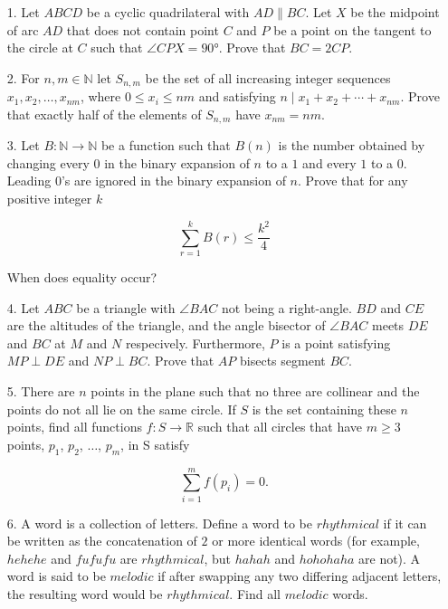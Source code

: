 \documentclass{article}
\begin{document}
\begin{enumerate}

\bigskip
\item[1.] %
Let $ABCD$ be a cyclic quadrilateral with $AD \parallel BC$. Let $X$ be the midpoint of arc $AD$ that does not contain point $C$ and $P$ be a point on the tangent to the circle at $C$ such that $\angle CPX = 90 \si{\degree} $. Prove that $BC = 2 CP$.   


\medskip
\item[2.] %
For $n,m\in\mathbb{N}$ let $S_{n,m}$ be the set of all increasing integer sequences $x_{1},x_{2},\ldots,x_{nm}$, where $0\leq x_i\leq nm$ and satisfying $n \mid x_{1} + x_{2} + \cdots +x_{nm}$. Prove that exactly half of the elements of $S_{n,m}$ have $x_{nm}=nm$.


\medskip
\item[3.] %
Let $B: \mathbb{N} \rightarrow \mathbb{N}$ be a function such that $B(n)$ is the number obtained by changing every $0$ in the binary expansion of $n$ to a $1$ and every $1$ to a $0$. Leading $0$'s are ignored in the binary expansion of $n$. Prove that for any positive integer $k$

$$\sum_{r=1}^{k} B(r) \le \frac{k^2}{4}$$

When does equality occur?


\medskip
\item[4.] %
Let $ABC$ be a triangle with $\angle BAC$ not being a right-angle. $BD$ and $CE$ are the altitudes of the triangle, and the angle bisector of $\angle BAC$ meets $DE$ and $BC$ at $M$ and $N$ respecively. Furthermore, $P$ is a point satisfying $MP \perp DE$ and $NP \perp BC$. Prove that $AP$ bisects segment $BC$.


\medskip
\item[5.] %
There are $n$ points in the plane such that no three are collinear and the points do not all lie on the same circle. If $S$ is the set containing these $n$ points, find all functions $f : S \rightarrow \mathbb{R}$ such that all circles that have $m \ge 3$ points, $p_1$, $p_2$, $\dots$, $p_m$, in S satisfy

$$\sum_{i = 1}^{m} f(p_i) = 0.$$



\medskip
\item[6.] %
A word is a collection of letters. Define a word to be $rhythmical$ if it can be written as the concatenation of $2$ or more identical words (for example, $hehehe$ and $fufufu$ are $rhythmical$, but $hahah$ and $hohohaha$ are not). A word is said to be $melodic$ if after swapping any two differing adjacent letters, the resulting word would be $rhythmical$. Find all $melodic$ words.



\end{enumerate}
\end{document}
